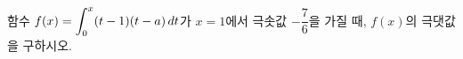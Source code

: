 함수 $f(x)=\displaystyle\int_{0}^{x} (t-1)(t-a)\mkern3mu dt$가 $x=1$에서 극솟값 $-\dfrac{7}{6}$을 가질 때, $f(x)$의 극댓값을 구하시오. 
